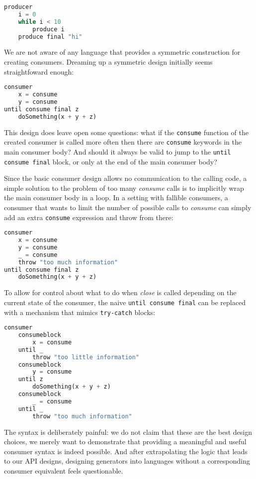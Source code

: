 \documentclass[sigplan,screen,10pt,anonymous,review]{acmart}
\begin{document}
\begin{lstlisting}[language=Python]
producer
    i = 0
    while i < 10
        produce i
    produce final "hi"
\end{lstlisting}

We are not aware of any language that provides a symmetric construction for creating consumers. Dreaming up a symmetric design initially seems straightfoward enough:

\begin{lstlisting}[language=Python]
consumer
    x = consume
    y = consume
until consume final z
    doSomething(x + y + z)
\end{lstlisting}

This design does leave open some questions: what if the \texttt{consume} function of the created consumer is called more often then there are \texttt{consume} keywords in the main consumer body? And should it always be valid to jump to the \texttt{until consume final} block, or only at the end of the main consumer body?

Since the basic consumer design allows no communication to the calling code, a simple solution to the problem of too many \textit{consume} calls is to implicitly wrap the main consumer body in a loop. In a setting with fallible consumers, a consumer that wants to limit the number of possible calls to \textit{consume} can simply add an extra \texttt{consume} expression and throw from there:

\begin{lstlisting}[language=Python]
consumer
    x = consume
    y = consume
    _ = consume
    throw "too much information"
until consume final z
    doSomething(x + y + z)
\end{lstlisting}

To allow for control about what to do when \textit{close} is called depending on the current state of the consumer, the naive \texttt{until consume final} can be replaced with a mechanism that mimics \texttt{try-catch} blocks:

\begin{lstlisting}[language=Python]
consumer
    consumeblock
        x = consume
    until _
        throw "too little information"
    consumeblock
        y = consume
    until z
        doSomething(x + y + z)
    consumeblock
        _ = consume
    until _
        throw "too much information"
\end{lstlisting}

The syntax is deliberately painful: we do not claim that these are the best design choices, we merely want to demonstrate that providing a meaningful and useful consumer syntax is indeed possible. And after extrapolating the logic that leads to our API designs, designing generators into languages without a corresponding consumer equivalent feels questionable.
\end{document}
